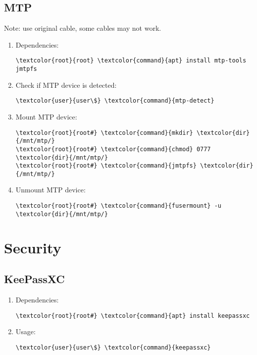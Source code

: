 \documentclass[10pt, a4paper, onecolumn, openany]{book} %
\begin{document}
\subsection{MTP}
Note: use original cable, some cables may not work.
\begin{enumerate}
    \item Dependencies:
\begin{Verbatim}[commandchars=\\\{\}]
\textcolor{root}{root} \textcolor{command}{apt} install mtp-tools jmtpfs
\end{Verbatim}
    \item Check if MTP device is detected:
\begin{Verbatim}[commandchars=\\\{\}]
\textcolor{user}{user\$} \textcolor{command}{mtp-detect}
\end{Verbatim}
    \item Mount MTP device:
\begin{Verbatim}[commandchars=\\\{\}]
\textcolor{root}{root#} \textcolor{command}{mkdir} \textcolor{dir}{/mnt/mtp/}
\textcolor{root}{root#} \textcolor{command}{chmod} 0777 \textcolor{dir}{/mnt/mtp/}
\textcolor{root}{root#} \textcolor{command}{jmtpfs} \textcolor{dir}{/mnt/mtp/}
\end{Verbatim}
    \item Unmount MTP device:
\begin{Verbatim}[commandchars=\\\{\}]
\textcolor{root}{root#} \textcolor{command}{fusermount} -u \textcolor{dir}{/mnt/mtp/}
\end{Verbatim}
\end{enumerate}
\section{Security}
\subsection{KeePassXC}
\begin{enumerate}
    \item Dependencies:
\begin{Verbatim}[commandchars=\\\{\}]
\textcolor{root}{root#} \textcolor{command}{apt} install keepassxc
\end{Verbatim}
    \item Usage:
\begin{Verbatim}[commandchars=\\\{\}]
\textcolor{user}{user\$} \textcolor{command}{keepassxc}
\end{Verbatim}
\end{enumerate}
\end{document}

